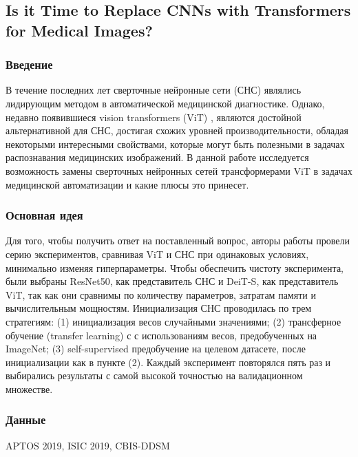 \subsection*{Is it Time to Replace CNNs with Transformers for Medical Images?}

\subsubsection*{Введение}
В течение последних лет сверточные нейронные сети (СНС)
являлись лидирующим методом в автоматической медицинской 
диагностике. Однако, недавно появившиеся vision transformers
(ViT) \cite{Transformers}, являются достойной альтернативной для СНС, достигая 
схожих уровней производительности, обладая некоторыми интересными свойствами,
которые могут быть полезными в задачах распознавания медицинских 
изображений. В данной работе исследуется возможность замены 
сверточных нейронных сетей трансформерами ViT в задачах 
медицинской автоматизации и какие плюсы это принесет. 
\subsubsection*{Основная идея}
Для того, чтобы получить ответ на поставленный вопрос, авторы работы \cite{ann11}
провели серию экспериментов, сравнивая ViT и СНС при одинаковых
условиях, минимально изменяя гиперпараметры. Чтобы обеспечить 
чистоту эксперимента, были выбраны ResNet50, как представитель СНС 
и DeiT-S, как представитель ViT, так как они сравнимы по 
количеству параметров, затратам памяти и вычислительным мощностям.
Инициализация СНС проводилась по трем стратегиям: (1) инициализация весов 
случайными значениями; (2) трансферное обучение (transfer learning) с 
с использованиям весов, предобученных на ImageNet; (3) self-supervised предобучение 
на целевом датасете, после инициализации как в пункте (2). Каждый эксперимент
повторялся пять раз и выбирались результаты с самой высокой точностью
на валидационном множестве.
\subsubsection*{Данные}
APTOS 2019, ISIC 2019, CBIS-DDSM
